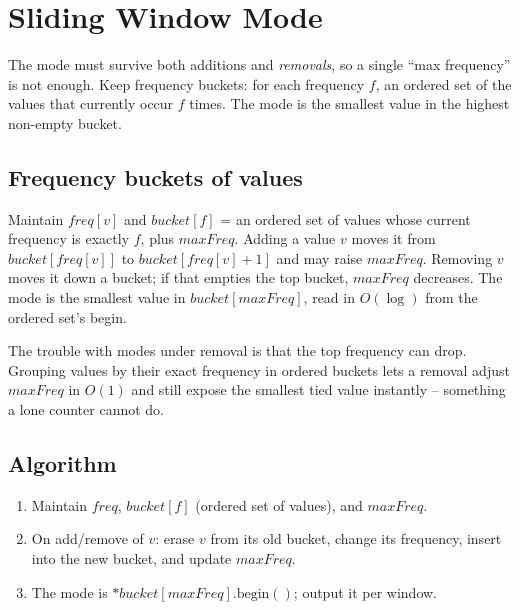 \section{Sliding Window Mode}
\label{sec:cses-sw-mode}


\begin{patternbox}
The mode must survive both additions and \emph{removals}, so a single
``max frequency'' is not enough. Keep frequency buckets: for each frequency
$f$, an ordered set of the values that currently occur $f$ times. The mode
is the smallest value in the highest non-empty bucket.
\end{patternbox}

\subsection*{Frequency buckets of values}

Maintain $\textit{freq}[v]$ and $\textit{bucket}[f]$ = an ordered set of
values whose current frequency is exactly $f$, plus $\textit{maxFreq}$.
Adding a value $v$ moves it from $\textit{bucket}[\textit{freq}[v]]$ to
$\textit{bucket}[\textit{freq}[v]+1]$ and may raise $\textit{maxFreq}$.
Removing $v$ moves it down a bucket; if that empties the top bucket,
$\textit{maxFreq}$ decreases. The mode is the smallest value in
$\textit{bucket}[\textit{maxFreq}]$, read in $O(\log)$ from the ordered
set's begin.

\begin{ideabox}
The trouble with modes under removal is that the top frequency can drop.
Grouping values by their exact frequency in ordered buckets lets a removal
adjust $\textit{maxFreq}$ in $O(1)$ and still expose the smallest tied
value instantly -- something a lone counter cannot do.
\end{ideabox}

\subsection*{Algorithm}

\begin{enumerate}
  \item Maintain $\textit{freq}$, $\textit{bucket}[f]$ (ordered set of
        values), and $\textit{maxFreq}$.
  \item On add/remove of $v$: erase $v$ from its old bucket, change its
        frequency, insert into the new bucket, and update
        $\textit{maxFreq}$.
  \item The mode is $\ast\textit{bucket}[\textit{maxFreq}].\text{begin}()$;
        output it per window.
\end{enumerate}

